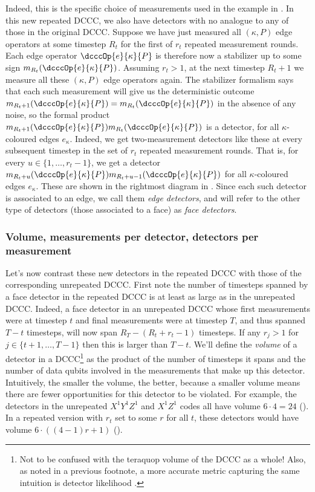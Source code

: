 Indeed, this is the specific choice of measurements used in the example in .
In this new repeated DCCC,
we also have detectors with no analogue to any of those in the original DCCC.
Suppose we have just measured all $(\kappa, P)$ edge operators at some timestep $R_t$
for the first of $r_t$ repeated measurement rounds.
Each edge operator $\dcccOp{e}{\kappa}{P}$ is therefore now a stabilizer up to some sign $m_{R_t}(\dcccOp{e}{\kappa}{P})$.
Assuming $r_t > 1$, at the next timestep $R_t + 1$ we measure all these $(\kappa, P)$ edge operators again.
The stabilizer formalism says that each such measurement will give us the deterministic outcome
$m_{R_t+1}(\dcccOp{e}{\kappa}{P}) = m_{R_t}(\dcccOp{e}{\kappa}{P})$ in the absence of any noise,
so the formal product $m_{R_t+1}(\dcccOp{e}{\kappa}{P}) m_{R_t}(\dcccOp{e}{\kappa}{P})$ is a detector,
for all $\kappa$-coloured edges $e_{\kappa}$.
Indeed, we get two-measurement detectors like these at every subsequent timestep
in the set of $r_t$ repeated measurement rounds.
That is, for every $u \in \{1, \ldots, r_t-1\}$,
we get a detector $m_{R_t + u}(\dcccOp{e}{\kappa}{P}) m_{R_t + u-1}(\dcccOp{e}{\kappa}{P})$
for all $\kappa$-coloured edges $e_{\kappa}$.
These are shown in the rightmost diagram in .
Since each such detector is associated to an edge, we call them \textit{edge detectors},
and will refer to the other type of detectors (those associated to a face) as \textit{face detectors}.\subsubsection{Volume, measurements per detector, detectors per measurement}\label{subsubsec:repeating_measurements_volume_measurements_detectors}

Let's now contrast these new detectors in the repeated DCCC with those of the corresponding unrepeated DCCC.
First note the number of timesteps spanned by a face detector in the repeated DCCC is at least as large as in the unrepeated DCCC.
Indeed, a face detector in an unrepeated DCCC whose first measurements were at timestep $t$ and final measurements were at timestep $T$, and thus spanned $T - t$ timesteps, will now span $R_T - (R_t + r_t - 1)$ timesteps.
If any $r_j > 1$ for $j \in \{t+1, \ldots, T-1\}$ then this is larger than $T-t$.
We'll define the \textit{volume} of a detector in a DCCC\footnote{Not to be confused with the teraquop volume of the DCCC as a whole! Also, as noted in a previous footnote, a more accurate metric capturing the same intuition is detector likelihood \cite{hesner2024using}.} as the product of the number of timesteps it spans and the number of data qubits involved in the measurements that make up this detector.
Intuitively, the smaller the volume, the better, because a smaller volume means there are fewer opportunities for this detector to be violated.
For example, the detectors in the unrepeated $X^1 Y^1 Z^1$ and $X^1 Z^1$ codes all have volume $6 \cdot 4 = 24$ ().
In a repeated version with $r_t$ set to some $r$ for all $t$, these detectors would have volume $6 \cdot ((4-1)r + 1)$ ().

